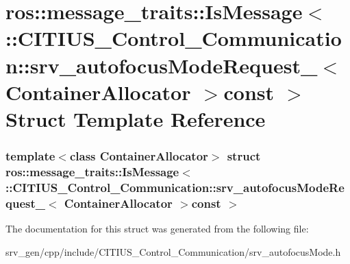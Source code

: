 \hypertarget{structros_1_1message__traits_1_1_is_message_3_01_1_1_c_i_t_i_u_s___control___communication_1_1sr85aa2fbc5092f76d2da5abf9faeed87a}{\section{ros\-:\-:message\-\_\-traits\-:\-:\-Is\-Message$<$ \-:\-:\-C\-I\-T\-I\-U\-S\-\_\-\-Control\-\_\-\-Communication\-:\-:srv\-\_\-autofocus\-Mode\-Request\-\_\-$<$ \-Container\-Allocator $>$const $>$ \-Struct \-Template \-Reference}
\label{structros_1_1message__traits_1_1_is_message_3_01_1_1_c_i_t_i_u_s___control___communication_1_1sr85aa2fbc5092f76d2da5abf9faeed87a}
}
\subsubsection*{template$<$class Container\-Allocator$>$ struct ros\-::message\-\_\-traits\-::\-Is\-Message$<$ \-::\-C\-I\-T\-I\-U\-S\-\_\-\-Control\-\_\-\-Communication\-::srv\-\_\-autofocus\-Mode\-Request\-\_\-$<$ Container\-Allocator $>$const  $>$}



\-The documentation for this struct was generated from the following file\-:\begin{DoxyCompactItemize}
\item 
srv\-\_\-gen/cpp/include/\-C\-I\-T\-I\-U\-S\-\_\-\-Control\-\_\-\-Communication/srv\-\_\-autofocus\-Mode.\-h\end{DoxyCompactItemize}
